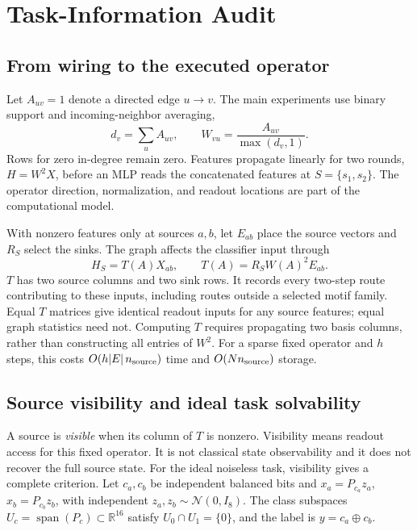 \section{Task-Information Audit}
\label{sec:method}


\subsection{From wiring to the executed operator}
\label{sec:operator}

Let $A_{uv}=1$ denote a directed edge $u\!\to\!v$. The main experiments
use binary support and incoming-neighbor averaging,
\begin{equation}
 d_v=\sum_u A_{uv},\qquad
 W_{vu}=\frac{A_{uv}}{\max(d_v,1)}.
 \label{eq:operator}
\end{equation}
Rows for zero in-degree remain zero. Features propagate linearly for two
rounds, $H=W^2X$, before an MLP reads the concatenated features at
$S=\{s_1,s_2\}$. The operator direction, normalization, and readout
locations are part of the computational model.

With nonzero features only at sources $a,b$, let $E_{ab}$ place the source
vectors and $R_S$ select the sinks. The graph affects the classifier input
through
\begin{equation}
 H_S=T(A)X_{ab},\qquad T(A)=R_SW(A)^2E_{ab}.
 \label{eq:transfer}
\end{equation}
$T$ has two source columns and two sink rows. It records every two-step
route contributing to these inputs, including routes outside a selected
motif family. Equal $T$ matrices give identical readout inputs for any
source features; equal graph statistics need not. Computing $T$ requires
propagating two basis columns, rather than constructing all entries of
$W^2$. For a sparse fixed operator and $h$ steps, this costs
$O(h|E|\,n_{\rm source})$ time and $O(Nn_{\rm source})$ storage.

\subsection{Source visibility and ideal task solvability}
\label{sec:observability}

A source is \emph{visible} when its column of $T$ is nonzero. Visibility means readout access for this fixed operator. It is not classical state observability and it does not recover the full source state.
For the ideal noiseless task, visibility gives a complete criterion.
Let $c_a,c_b$ be independent balanced bits and
$x_a=P_{c_a}z_a$, $x_b=P_{c_b}z_b$, with independent
$z_a,z_b\sim\mathcal N(0,I_8)$. The class subspaces
$U_c=\operatorname{span}(P_c)\subset\mathbb R^{16}$ satisfy
$U_0\cap U_1=\{0\}$, and the label is $y=c_a\oplus c_b$.

